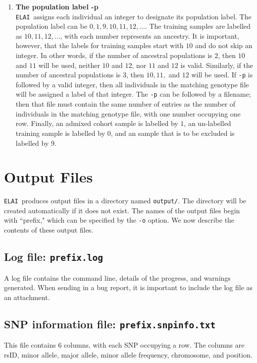 \documentclass[11pt,Palatino]{article}
\def\elai{{\tt{ELAI}}~}
\begin{document}
\begin{enumerate}
\item {\bf The population label -p} \\
 \elai assigns each individual an integer to designate its population label. The population label can be $0, 1, 9, 10, 11, 12, \dots$. The training samples are labelled as $10, 11, 12, \dots$, with each number represents an ancestry. It is important, however, that the labels for training samples start with $10$ and do not skip an integer. In other words, if the number of ancestral populations is $2$, then $10$ and $11$ will be used, neither $10$ and $12$, nor $11$ and $12$ is valid. Similarly, if the number of ancestral populations is $3$, then $10,11,$ and $12$ will be used. If {\tt -p} is followed by a valid integer, then all individuals in the matching genotype file will be assigned a label of that integer. The {\tt -p} can be followed by a filename; then that file must contain the same number of entries as the number of individuals in the matching genotype file, with one number occupying one row. Finally, an admixed cohort sample is labelled by $1$, an un-labelled training sample is labelled by $0$, and an sample that is to be excluded is labelled by $9$.  
\end{enumerate}


\section{Output Files } \label{output}

\elai produces output files in a directory named {\tt output/}.  The directory will be created automatically if it does not exist.  The names of the output files begin with ``prefix," which can be specified by the {\tt -o} option. We now describe the contents of these output files.

\subsection{Log file: {\tt prefix.log}}
A log file contains the command line, details of the progress, and warnings generated.
When sending in a bug report, it is important to include the log file as an attachment. 

\subsection{SNP information file: {\tt prefix.snpinfo.txt}}
This file contains $6$ columns, with each SNP occupying a row.  The columns are rsID, minor allele, major allele, minor allele frequency, chromosome, and position.   
\end{document}
